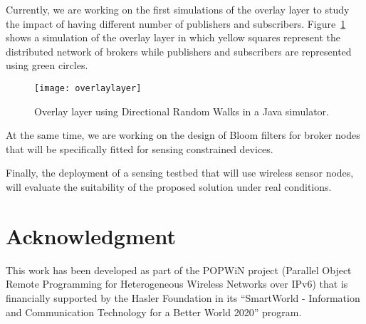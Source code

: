\documentclass[conference]{IEEEtran}
\begin{document}
Currently, we are working on the first simulations of the overlay layer to study the impact of having different number of publishers and subscribers. Figure~\ref{overlaylayer} shows a simulation of the overlay layer in which yellow squares represent the distributed network of brokers while publishers and subscribers are represented using green circles.

\begin{figure}[!h]
\centering
\texttt{[image: overlaylayer]}
\caption{Overlay layer using Directional Random Walks in a Java simulator.}
\vspace{-1.02em}
\label{overlaylayer}
\end{figure}

At the same time, we are working on the design of Bloom filters for broker nodes that will be specifically fitted for sensing constrained devices. 

Finally, the deployment of a sensing testbed that will use wireless sensor nodes, will evaluate the suitability of the proposed solution under real conditions.


\vspace{0.27em}
\section*{Acknowledgment}


This work has been developed as part of the POPWiN project (Parallel Object Remote Programming for Heterogeneous Wireless Networks over IPv6) that is financially supported by the Hasler Foundation in its “SmartWorld - Information and Communication Technology for a Better World 2020” program.



\end{document}
